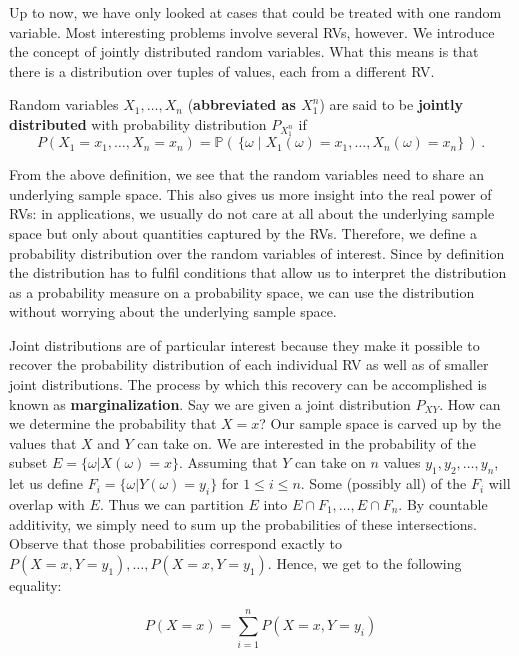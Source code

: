 Up to now, we have only looked at cases that could be treated with one random variable. Most interesting problems involve several RVs, however. We introduce the concept of jointly distributed random variables. What this means is that
there is a distribution over tuples of values, each from a different RV.

\begin{Definition}
Random variables $ X_{1}, \ldots, X_{n} $ (\textbf{abbreviated as $ X^{n}_{1} $}) 
are said to be \textbf{jointly distributed} with probability distribution $ P_{X_{1}^{n}} $ if
$$ P(X_{1}=x_{1}, \ldots, X_{n}=x_{n}) = \mathbb{P}(\, \{\omega \mid
X_{1}(\omega) = x_{1}, \ldots, X_{n}(\omega)=x_{n}\}\, ) \, . $$ 
\end{Definition}

From the above definition, we see that the random variables need to
share an underlying sample space. This also gives us more insight into
the real power of RVs: in applications, we usually do not care at all
about the underlying sample space but only about quantities
captured by the RVs. Therefore, we define a probability distribution over the
random variables of interest. Since by definition the distribution has
to fulfil conditions that allow us to interpret the distribution
as a probability measure on a probability space, we can use the distribution without worrying
about the underlying sample space.

Joint distributions are of particular interest because they make it possible to recover the probability distribution of each individual
RV as well as of smaller joint distributions. The process by which this recovery can be accomplished is known as \textbf{marginalization}. Say
we are given a joint distribution $ P_{XY} $. How can we determine the probability that $ X=x $? Our sample space is carved
up by the values that $ X $ and $ Y $ can take on. We are interested in the probability of the subset $ E = \{\omega|X(\omega)=x\} $.
Assuming that $ Y $ can take on $ n $ values $y_1,y_2,\ldots,y_n$, let us define $ F_{i} = \{\omega| Y(\omega) = y_{i}\} $ for $ 1 \leq i \leq n $.
Some (possibly all) of the $ F_{i} $ will overlap with $ E $. Thus we can partition $ E $ into $ E\cap F_{1}, \ldots, E \cap F_{n} $.
By countable additivity, we simply need to sum up the probabilities of these intersections. Observe that those probabilities correspond exactly to $ P(X=x,Y=y_{1}), \ldots, P(X=x,Y=y_{1}) $. Hence, we get to the following equality:

\begin{equation} \label{simpleMarginal}
P(X=x) = \overset{n}{\underset{i=1}{\sum}} P(X=x,Y=y_{i}) 
\end{equation}

